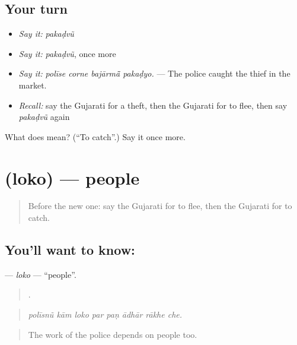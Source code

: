 \subsection*{Your turn}
\begin{itemize}
\raggedright
  \item \emph{Say it:} \emph{pakaḍvũ}
  \item \emph{Say it:} \emph{pakaḍvũ}, once more
  \item \emph{Say it:} \emph{polīse corne bajārmā̃ pakaḍyo.} — The police caught the thief in the market.
  \item \emph{Recall:} say the Gujarati for a theft, then the Gujarati for to flee, then say \emph{pakaḍvũ} again
\end{itemize}

\begin{tcolorbox}[breakable,colback=teal!4,colframe=teal!35!black,title={Before you move on}]
What does  mean? (\textquotedblleft{}To catch\textquotedblright{}.) Say it once more.
\end{tcolorbox}
\section[\texorpdfstring{\gu{લોકો} (loko)}{લોકો (loko)}]{ (loko) — people}

\label{lesson:GU-C285-loko}



\begin{quote}
Before the new one: say the Gujarati for to flee, then the Gujarati for to catch.
\end{quote}

\subsection*{You'll want to know: }
\textbf{} — \emph{loko} — \textquotedblleft{}people\textquotedblright{}.

\begin{quote}
       .
\end{quote}

\begin{quote}
\emph{polīsnũ kām loko par paṇ ādhār rākhe che.}
\end{quote}

\begin{quote}
The work of the police depends on people too.
\end{quote}


